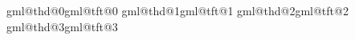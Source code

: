 \def\gml@tablerule{.4pt}
\def\gml@cellhpad{4pt}
\def\gml@cellvpad{2pt}
\newdimen\gml@tblwd \newdimen\gml@tbloff \newdimen\gml@tblrule
\newdimen\gml@tA \newdimen\gml@tR \newdimen\gml@tU \newdimen\gml@tS \newdimen\gml@tX
\newdimen\gml@tW \newdimen\gml@tH \newdimen\gml@tI \newdimen\gml@tY
\newcount\gml@tblno \newcount\gml@tblncols \newcount\gml@tblncell \newcount\gml@tblS
\newcount\gml@tblk \newcount\gml@tbli \newcount\gml@tblb \newcount\gml@tK
\newcount\gml@tblcpart \newcount\gml@tbllaststar
\newbox\gml@rowbox \newbox\gml@chunk \newbox\gml@tblrest \newbox\gml@tblpg \newbox\gml@tblpart
\newif\ifgml@tblopen \newif\ifgml@tblfirst \newif\ifgml@tblthd \newif\ifgml@tblmarks
\newif\ifgml@tblfoot
\newbox\gml@tblfns \newbox\gml@chunkfns \newbox\gml@tftfns
\newif\ifgml@incell \newdimen\gml@tblfnhsize
\expandafter\newbox\csname gml@thd@0\endcsname \expandafter\newbox\csname gml@tft@0\endcsname
\expandafter\newbox\csname gml@thd@1\endcsname \expandafter\newbox\csname gml@tft@1\endcsname
\expandafter\newbox\csname gml@thd@2\endcsname \expandafter\newbox\csname gml@tft@2\endcsname
\expandafter\newbox\csname gml@thd@3\endcsname \expandafter\newbox\csname gml@tft@3\endcsname
